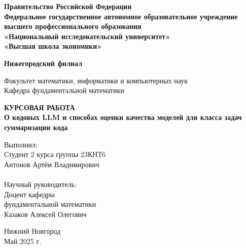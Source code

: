 \documentclass[14pt]{article}
\theoremstyle{definition}
\begin{document}
\begin{titlepage}
  \begin{center}
    \normalsize
   \textbf {Правительство Российской Федерации\\ 
Федеральное государственное автономное образовательное учреждение\\
   высшего профессионального образования\\
    «Национальный исследовательский университет» \\
     «Высшая школа экономики»}
   

    
    
    
    \textbf {Нижегородский филиал}
    
  \vfill
    Факультет математики, информатики и компьютерных наук\\
    Кафедра фундаментальной математики
    
   
    \vfill

    \textbf{ КУРСОВАЯ РАБОТА}\\[5mm]
    
    {\normalsize  \textbf{О кодовых LLM и способах оценки качества моделей для класса задач
суммаризации кода}}
    
  \bigskip
    
    
\end{center}
\vfill

\newlength{\ML}
\hfill
\begin{minipage}{0.5\textwidth}
  Выполнил:\\
 Студент 2 курса группы 23КНТ6    
   \\
 Антонов Артём Владимирович\\ 


 \\Научный руководитель:\\
 Доцент кафедры\\ 
 фундаментальной математики\\
Казаков Алексей  Олегович\\
  \vspace{1cm}
 {\hspace{2.5cm}}
\end{minipage}%
\vfill

\begin{center}
  Нижний Новгород\\Май 2025 г.
\end{center}

\end{titlepage}
\end{document}
